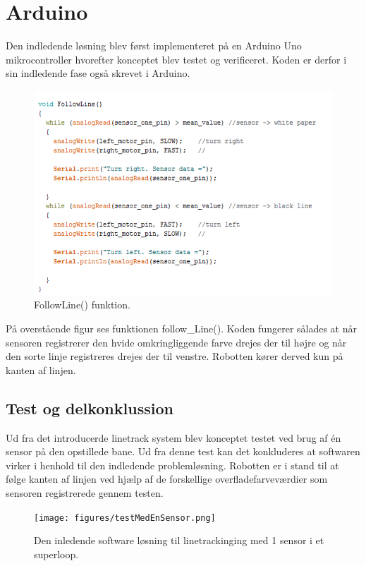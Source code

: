 \section{Arduino}
Den indledende løsning blev først implementeret på en Arduino Uno mikrocontroller hvorefter konceptet blev testet og verificeret. Koden er derfor i sin indledende fase også skrevet i Arduino.

\begin{figure}[h!]
  \centering
  \includegraphics[width=1.0\textwidth]{figures/followLine2.png}
  \caption{FollowLine() funktion.}
  \label{follow_line_kode}
\end{figure}

På overstående figur ses funktionen follow\_Line(). Koden fungerer sålades at når sensoren registrerer den hvide omkringliggende farve drejes der til højre og når den sorte linje registreres drejes der til venstre. Robotten kører derved kun på kanten af linjen. 

\subsection{Test og delkonklussion}
Ud fra det introducerde linetrack system blev konceptet testet ved brug af én sensor på den opstillede bane. 
\newline
Ud fra denne test kan det konkluderes at softwaren virker i henhold til den indledende problemløsning. Robotten er i stand til at følge kanten af linjen ved hjælp af de forskellige overfladefarveværdier som sensoren registrerede gennem testen. 
\newline

\begin{figure}[h!]
  \centering
  \texttt{[image: figures/testMedEnSensor.png]}
  \caption{Den inledende software løsning til linetrackinging med 1 sensor i et superloop.}
  \label{indledende_test}
\end{figure}
\newpage

